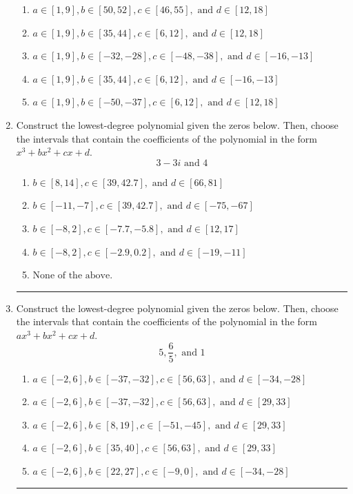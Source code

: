 \documentclass[14pt]{extbook}
\newcommand{\litem}[1]{\item#1\hspace*{-1cm}\rule{\textwidth}{0.4pt}}
\begin{document}
\begin{enumerate}
{\begin{enumerate}[label=\Alph*.]
\item \( a \in [1, 9], b \in [50, 52], c \in [46, 55], \text{ and } d \in [12, 18] \)
\item \( a \in [1, 9], b \in [35, 44], c \in [6, 12], \text{ and } d \in [12, 18] \)
\item \( a \in [1, 9], b \in [-32, -28], c \in [-48, -38], \text{ and } d \in [-16, -13] \)
\item \( a \in [1, 9], b \in [35, 44], c \in [6, 12], \text{ and } d \in [-16, -13] \)
\item \( a \in [1, 9], b \in [-50, -37], c \in [6, 12], \text{ and } d \in [12, 18] \)

\end{enumerate} }
\litem{
Construct the lowest-degree polynomial given the zeros below. Then, choose the intervals that contain the coefficients of the polynomial in the form $x^3+bx^2+cx+d$.\[ 3 - 3 i \text{ and } 4 \]\begin{enumerate}[label=\Alph*.]
\item \( b \in [8, 14], c \in [39, 42.7], \text{ and } d \in [66, 81] \)
\item \( b \in [-11, -7], c \in [39, 42.7], \text{ and } d \in [-75, -67] \)
\item \( b \in [-8, 2], c \in [-7.7, -5.8], \text{ and } d \in [12, 17] \)
\item \( b \in [-8, 2], c \in [-2.9, 0.2], \text{ and } d \in [-19, -11] \)
\item \( \text{None of the above.} \)

\end{enumerate} }
\litem{
Construct the lowest-degree polynomial given the zeros below. Then, choose the intervals that contain the coefficients of the polynomial in the form $ax^3+bx^2+cx+d$.\[ 5, \frac{6}{5}, \text{ and } 1 \]\begin{enumerate}[label=\Alph*.]
\item \( a \in [-2, 6], b \in [-37, -32], c \in [56, 63], \text{ and } d \in [-34, -28] \)
\item \( a \in [-2, 6], b \in [-37, -32], c \in [56, 63], \text{ and } d \in [29, 33] \)
\item \( a \in [-2, 6], b \in [8, 19], c \in [-51, -45], \text{ and } d \in [29, 33] \)
\item \( a \in [-2, 6], b \in [35, 40], c \in [56, 63], \text{ and } d \in [29, 33] \)
\item \( a \in [-2, 6], b \in [22, 27], c \in [-9, 0], \text{ and } d \in [-34, -28] \)

\end{enumerate} }
\end{enumerate}
\end{document}
